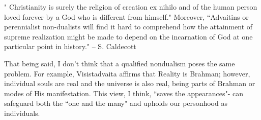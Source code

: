 \begin{footnotesize}
\begin{sffamily}
" Christianity is surely the religion of creation ex nihilo and of the human person loved forever by a God who is different from himself." Moreover, ``Advaitins or perennialist non-dualists will find it hard to comprehend how the attainment of supreme realization might be made to depend on the incarnation of God at one particular point in history." – S. Caldecott

That being said, I don't think that a qualified nondualism poses the same problem. For example, Visistadvaita affirms that Reality is Brahman; however, individual souls are real and the universe is also real, being parts of Brahman or modes of His manifestation. This view, I think, ``saves the appearances"- can safeguard both the ``one and the many" and upholds our personhood as individuals.

\end{sffamily}\end{footnotesize}
